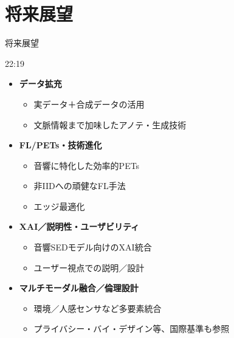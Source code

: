 \documentclass[unicode,12pt,aspectratio=169,dvipdfmx]{beamer}
\begin{document}
\section{将来展望}
\begin{frame}{将来展望}




22:19
\begin{itemize}
    \item \textbf{データ拡充}
      \begin{itemize}
        \item 実データ＋合成データの活用
        \item 文脈情報まで加味したアノテ・生成技術
      \end{itemize}
    \item \textbf{FL/PETs・技術進化}
      \begin{itemize}
        \item 音響に特化した効率的PETs
        \item 非IIDへの頑健なFL手法
        \item エッジ最適化
      \end{itemize}
    \item \textbf{XAI／説明性・ユーザビリティ}
      \begin{itemize}
        \item 音響SEDモデル向けのXAI統合
        \item ユーザー視点での説明／設計
      \end{itemize}
    \item \textbf{マルチモーダル融合／倫理設計}
      \begin{itemize}
        \item 環境／人感センサなど多要素統合
        \item プライバシー・バイ・デザイン等、国際基準も参照
      \end{itemize}
  \end{itemize}
\end{frame}
\end{document}
